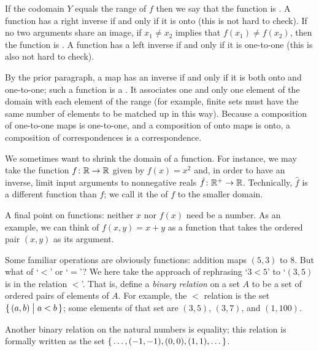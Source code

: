 If the codomain \( Y \) equals the range of \( f \) then 
we say that the function is
.
A function has a right inverse if and only if it is onto 
(this is not hard to check).
If no two arguments share an image, if
\( x_1\neq x_2 \) implies  that \( f(x_1)\neq f(x_2) \), then the function is
.
A function has a left inverse if and only if it is one-to-one (this is also 
not hard to check).

By the prior paragraph, a map has an inverse if and only if it is both
onto and one-to-one; such a function is a 
.
It associates one and only one element of the domain with each element of the
range (for example, finite sets must have the same number of elements to be
matched up in this way).
Because a composition of one-to-one maps is one-to-one, and a composition
of onto maps is onto, a composition of correspondences is a
correspondence.

We sometimes want to shrink the domain of a function.
For instance, we may take the function \( \mbox{$f\colon \mathbb{R}\to \mathbb{R}$} \) given by
\( f(x)=x^2 \) and, in order to have an inverse, limit input arguments to
nonnegative reals \( \mbox{$\hat{f}\colon \mathbb{R}^+\to \mathbb{R}$} \).
Technically, \( \hat{f} \) is a different function than \( f \); we call it
the  of
\( f \) to the smaller domain.

A final point on functions: neither \( x \) nor \( f(x) \) need be a number.
As an example, we can think of \( f(x,y)=x+y \) as a function that
takes the ordered pair \( (x,y) \) as its argument.







Some familiar operations are obviously functions:
addition maps \( (5,3) \) to \( 8 \).
But what of `\( < \)' or `\( = \)'?
We here take the approach of rephrasing `\( 3<5 \)' to `\( (3,5) \) is
in the relation \( < \)'.
That is, define a {\em binary relation\/} on a set \( A \) to be
a set of ordered pairs of elements of \( A \).
For example, the \( < \) relation is the set
\(  \mbox{$\{\,(a,b)\bigm| a<b\,\}$} \); some elements of that set are
\( (3,5) \), \( (3,7) \), and \( (1,100) \).

Another binary relation on the natural numbers is equality; this relation is
formally written as the set
\( \mbox{$\{\,\ldots,(-1,-1),(0,0),(1,1),\ldots\,\}$} \).

